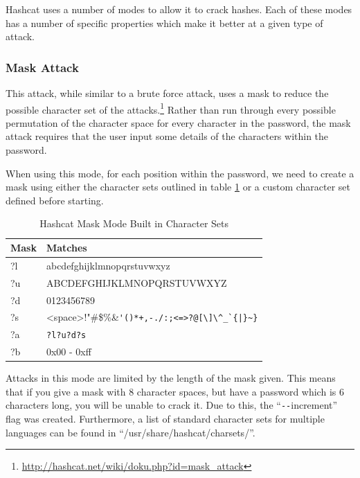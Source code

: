 			Hashcat uses a number of modes to allow it to crack hashes.
			Each of these modes has a number of specific properties which make it better at a given type of attack.

			\subsubsection{Mask Attack}
				This attack, while similar to a brute force attack, uses a mask to reduce the possible character set of the attacks.\footnote{\url{http://hashcat.net/wiki/doku.php?id=mask_attack}}
				Rather than run through every possible permutation of the character space for every character in the password, the mask attack requires that the user input some details of the characters within the password.

				When using this mode, for each position within the password, we need to create a mask using either the character sets outlined in table \ref{tab:HashcatMaskCharSets} or a custom character set defined before starting.
				\begin{table}[htb]
					\centering
				\begin{adjustbox}{max width=1\textwidth}
					\begin{tabular}{ll}
						\toprule
						\textbf{Mask} & \textbf{Matches} \\
						\toprule
						?l & abcdefghijklmnopqrstuvwxyz \\
						?u & ABCDEFGHIJKLMNOPQRSTUVWXYZ \\
						?d & 0123456789 \\
						?s & <space>!"\#\$\%\&\verb!'()*+,-./:;<=>?@[\]\^_`{|}~}! \\
						?a & \verb+?l?u?d?s+ \\
						?b & 0x00 - 0xff \\
						\bottomrule
					\end{tabular}
				\end{adjustbox}
					\caption{Hashcat Mask Mode Built in Character Sets}
					\label{tab:HashcatMaskCharSets}
				\end{table}
				Attacks in this mode are limited by the length of the mask given.
				This means that if you give a mask with 8 character spaces, but have a password which is 6 characters long, you will be unable to crack it.
				Due to this, the ``\verb+--+increment'' flag was created.
				Furthermore, a list of standard character sets for multiple languages can be found in ``/usr/share/hashcat/charsets/''.

